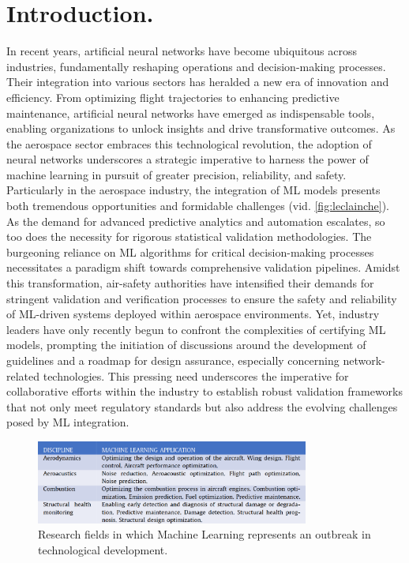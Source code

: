 \chapter{Introduction.}
%
\indent In recent years, artificial neural networks have become ubiquitous across industries, fundamentally reshaping operations and decision-making processes. Their integration into various sectors has heralded a new era of innovation and efficiency. From optimizing flight trajectories\cite{xu2023machine} to enhancing predictive maintenance\cite{shukla2020opportunities,adhikari2018machine,korvesis2017machine}, artificial neural networks have emerged as indispensable tools, enabling organizations to unlock insights and drive transformative outcomes. As the aerospace sector embraces this technological revolution, the adoption of neural networks underscores a strategic imperative to harness the power of machine learning in pursuit of greater precision, reliability, and safety. Particularly in the aerospace industry, the integration of ML models presents both tremendous opportunities and formidable challenges (vid. \autoref{fig:leclainche}). As the demand for advanced predictive analytics and automation escalates, so too does the necessity for rigorous statistical validation methodologies. The burgeoning reliance on ML algorithms for critical decision-making processes necessitates a paradigm shift towards comprehensive validation pipelines. Amidst this transformation, air-safety authorities have intensified their demands for stringent validation and verification processes\cite{force2021concepts,roadmap2021easa} to ensure the safety and reliability of ML-driven systems deployed within aerospace environments. Yet, industry leaders have only recently begun to confront the complexities of certifying ML models\cite{henderson2022toward,durand2023formal,dmitriev2021toward,el2022certification,paul2023assurance}, prompting the initiation of discussions around the development of guidelines and a roadmap for design assurance, especially concerning network-related technologies. This pressing need underscores the imperative for collaborative efforts within the industry to establish robust validation frameworks that not only meet regulatory standards but also address the evolving challenges posed by ML integration.\\
\begin{figure}[!htb]
	\centering
	\includegraphics[width=0.8\textwidth]{Figures/ml_applications.png}
	\caption{Research fields in which Machine Learning represents an outbreak in technological development. \cite{le2023improving}}
	\label{fig:leclainche}
\end{figure}

